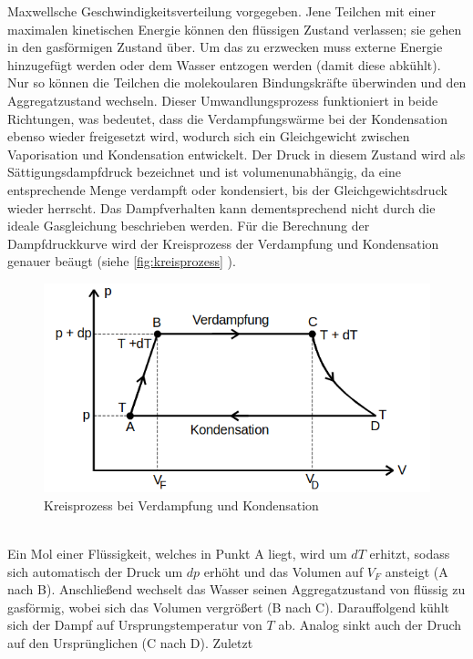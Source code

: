 Maxwellsche Geschwindigkeitsverteilung vorgegeben. Jene Teilchen mit einer 
maximalen kinetischen Energie können den flüssigen Zustand verlassen; sie gehen 
in den gasförmigen Zustand über. Um das zu erzwecken muss externe Energie 
hinzugefügt werden oder dem Wasser entzogen werden (damit diese abkühlt). Nur 
so können die Teilchen die molekoularen Bindungskräfte überwinden und den 
Aggregatzustand wechseln. Dieser Umwandlungsprozess funktioniert in beide 
Richtungen, was bedeutet, dass die Verdampfungswärme bei der Kondensation ebenso
wieder freigesetzt wird, wodurch sich ein Gleichgewicht zwischen Vaporisation und
Kondensation entwickelt. Der Druck in diesem Zustand wird als Sättigungsdampfdruck 
bezeichnet und ist volumenunabhängig, da eine entsprechende Menge verdampft oder 
kondensiert, bis der Gleichgewichtsdruck wieder herrscht. Das Dampfverhalten 
kann dementsprechend nicht durch die ideale Gasgleichung beschrieben werden.
Für die Berechnung der Dampfdruckkurve wird der Kreisprozess der Verdampfung 
und Kondensation genauer beäugt (siehe \autoref{fig:kreisprozess} \cite{kreisprozess}).
\begin{figure}[h]
    \centering
        \centering
        \includegraphics[width=\textwidth]{Bilder/kreisprozess.png}
        \caption{Kreisprozess bei Verdampfung und Kondensation}
    \hfill
    \label{fig:kreisprozess}
\end{figure}
\\
Ein Mol einer Flüssigkeit, welches in Punkt A liegt, wird um $dT$ erhitzt, 
sodass sich automatisch der Druck um $dp$ erhöht und das Volumen auf $V_F$ 
ansteigt (A nach B). Anschließend wechselt das Wasser seinen Aggregatzustand
von flüssig zu gasförmig, wobei sich das Volumen vergrößert (B nach C).
Darauffolgend kühlt sich der Dampf auf Ursprungstemperatur von $T$ ab.
Analog sinkt auch der Druch auf den Ursprünglichen (C nach D). Zuletzt 
